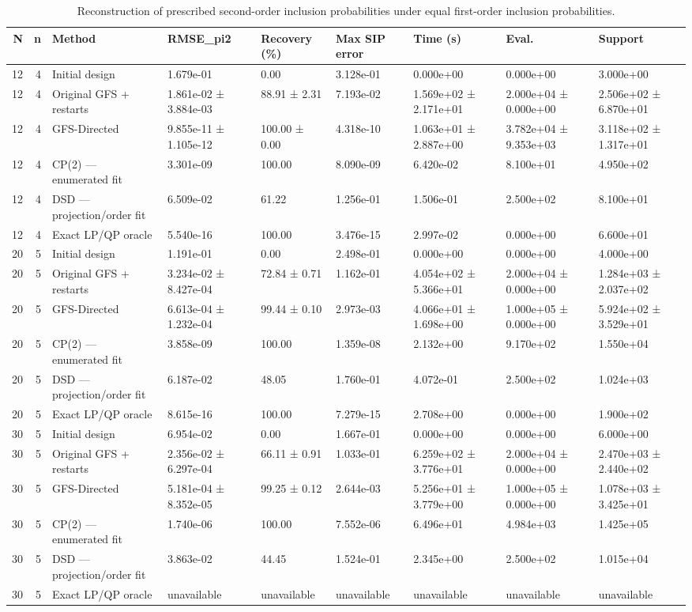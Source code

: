 \begin{table}
\caption{Reconstruction of prescribed second-order inclusion probabilities under equal first-order inclusion probabilities.}
\begin{tabular}{rrlllllll}
\toprule
N & n & Method & RMSE\_pi2 & Recovery (\%) & Max SIP error & Time (s) & Eval. & Support \\
\midrule
12 & 4 & Initial design & 1.679e-01 & 0.00 & 3.128e-01 & 0.000e+00 & 0.000e+00 & 3.000e+00 \\
12 & 4 & Original GFS + restarts & 1.861e-02 ± 3.884e-03 & 88.91 ± 2.31 & 7.193e-02 & 1.569e+02 ± 2.171e+01 & 2.000e+04 ± 0.000e+00 & 2.506e+02 ± 6.870e+01 \\
12 & 4 & GFS-Directed & 9.855e-11 ± 1.105e-12 & 100.00 ± 0.00 & 4.318e-10 & 1.063e+01 ± 2.887e+00 & 3.782e+04 ± 9.353e+03 & 3.118e+02 ± 1.317e+01 \\
12 & 4 & CP(2) — enumerated fit & 3.301e-09 & 100.00 & 8.090e-09 & 6.420e-02 & 8.100e+01 & 4.950e+02 \\
12 & 4 & DSD — projection/order fit & 6.509e-02 & 61.22 & 1.256e-01 & 1.506e-01 & 2.500e+02 & 8.100e+01 \\
12 & 4 & Exact LP/QP oracle & 5.540e-16 & 100.00 & 3.476e-15 & 2.997e-02 & 0.000e+00 & 6.600e+01 \\
20 & 5 & Initial design & 1.191e-01 & 0.00 & 2.498e-01 & 0.000e+00 & 0.000e+00 & 4.000e+00 \\
20 & 5 & Original GFS + restarts & 3.234e-02 ± 8.427e-04 & 72.84 ± 0.71 & 1.162e-01 & 4.054e+02 ± 5.366e+01 & 2.000e+04 ± 0.000e+00 & 1.284e+03 ± 2.037e+02 \\
20 & 5 & GFS-Directed & 6.613e-04 ± 1.232e-04 & 99.44 ± 0.10 & 2.973e-03 & 4.066e+01 ± 1.698e+00 & 1.000e+05 ± 0.000e+00 & 5.924e+02 ± 3.529e+01 \\
20 & 5 & CP(2) — enumerated fit & 3.858e-09 & 100.00 & 1.359e-08 & 2.132e+00 & 9.170e+02 & 1.550e+04 \\
20 & 5 & DSD — projection/order fit & 6.187e-02 & 48.05 & 1.760e-01 & 4.072e-01 & 2.500e+02 & 1.024e+03 \\
20 & 5 & Exact LP/QP oracle & 8.615e-16 & 100.00 & 7.279e-15 & 2.708e+00 & 0.000e+00 & 1.900e+02 \\
30 & 5 & Initial design & 6.954e-02 & 0.00 & 1.667e-01 & 0.000e+00 & 0.000e+00 & 6.000e+00 \\
30 & 5 & Original GFS + restarts & 2.356e-02 ± 6.297e-04 & 66.11 ± 0.91 & 1.033e-01 & 6.259e+02 ± 3.776e+01 & 2.000e+04 ± 0.000e+00 & 2.470e+03 ± 2.440e+02 \\
30 & 5 & GFS-Directed & 5.181e-04 ± 8.352e-05 & 99.25 ± 0.12 & 2.644e-03 & 5.256e+01 ± 3.779e+00 & 1.000e+05 ± 0.000e+00 & 1.078e+03 ± 3.425e+01 \\
30 & 5 & CP(2) — enumerated fit & 1.740e-06 & 100.00 & 7.552e-06 & 6.496e+01 & 4.984e+03 & 1.425e+05 \\
30 & 5 & DSD — projection/order fit & 3.863e-02 & 44.45 & 1.524e-01 & 2.345e+00 & 2.500e+02 & 1.015e+04 \\
30 & 5 & Exact LP/QP oracle & unavailable & unavailable & unavailable & unavailable & unavailable & unavailable \\
\bottomrule
\end{tabular}
\end{table}
